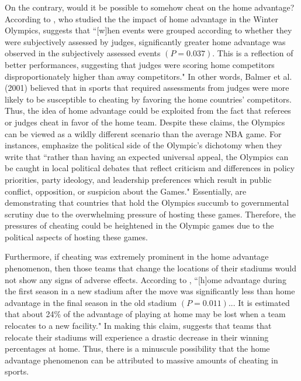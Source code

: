 \documentclass[12pt,english]{article}
\begin{document}
\par On the contrary, would it be possible to somehow cheat on the home advantage? According to \citet{Nigel}, who studied the the impact of home advantage in the Winter Olympics, suggests that “[w]hen events were grouped according to whether they were subjectively assessed by judges, significantly greater home advantage was observed in the subjectively assessed events $(P = 0.037)$. This is a reflection of better performances, suggesting that judges were scoring home competitors disproportionately higher than away competitors." In other words, Balmer et al.(2001) believed that in sports that required assessments from judges were more likely to be susceptible to cheating by favoring the home countries' competitors. Thus, the idea of home advantage could be exploited from the fact that referees or judges cheat in favor of the home team. Despite these claims, the Olympics can be viewed as a wildly different scenario than the average NBA game. For instances, \citet{Hiller} emphasize the political side of the Olympic's dichotomy when they write that “rather than having an expected universal appeal, the Olympics can be caught in local political debates that reflect criticism and differences in policy priorities, party ideology, and leadership preferences which result in public conflict, opposition, or suspicion about the Games." Essentially, \citet{Hiller} are demonstrating that countries that hold the Olympics succumb to governmental scrutiny due to the overwhelming pressure of hosting these games. Therefore, the pressures of cheating could be heightened in the Olympic games due to the political aspects of hosting these games. 
\par Furthermore, if cheating was extremely prominent in the home advantage phenomenon, then those teams that change the locations of their stadiums would not show any signs of adverse effects. According to \citet{Richard}, “[h]ome advantage during the first season in a new stadium after the move was significantly less than home advantage in the final season in the old stadium $(P=0.011)$... It is estimated that about 24\% of the advantage of playing at home may be lost when a team relocates to a new facility." In making this claim, \citet{Richard} suggests that teams that relocate their stadiums will experience a drastic decrease in their winning percentages at home. Thus, there is a minuscule possibility that the home advantage phenomenon can be attributed to massive amounts of cheating in sports. 
\end{document}
